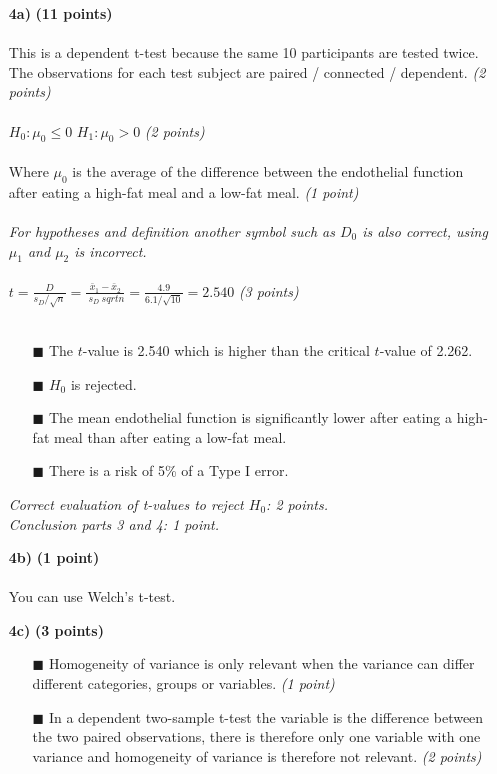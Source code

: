 \begin{itemize}
\item[\textbf{4a)}] \textbf{(11 points)} \\ \\
This is a dependent t-test because the same 10 participants are tested twice. The observations for each test subject are paired / connected / dependent. \textit{(2 points)}\\ \\
$H_0: \mu_0 \leq 0$ \hspace{3cm} $H_1: \mu_0 > 0$ \hspace{3cm} \textit{(2 points)} \\ \\
Where $\mu_0$ is the average of the difference between the endothelial function after eating a high-fat meal and a low-fat meal. \textit{(1 point)} \\ \\ 
\textit{For hypotheses and definition another symbol such as $D_0$ is also correct, using $\mu_1$ and $\mu_2$ is incorrect.} \\ \\
$t = \frac{D}{s_D / \sqrt{n}} = \frac{\bar{x}_1 - \bar{x}_2}{ \ s_D \ sqrt{n}} = \frac{4.9}{6.1 / \sqrt{10}} = 2.540$ \textit{(3 points)}\\ \\
        \begin{itemize}
        \item[$\blacksquare$] The $t$-value is 2.540 which is higher than the critical $t$-value of 2.262.
        \item[$\blacksquare$] $H_0$ is rejected.
        \item[$\blacksquare$] The mean endothelial function is significantly lower after eating a high-fat meal than after eating a low-fat meal.
\item[$\blacksquare$] There is a risk of 5\% of a Type I error.
        \end{itemize}
        \textit{Correct evaluation of t-values to reject $H_0$: 2 points. \\ Conclusion parts 3 and 4: 1 point.} \\
\item[\textbf{4b)}] \textbf{(1 point)} \\ \\
You can use Welch’s t-test. \\
\item[\textbf{4c)}] \textbf{(3 points)} \\
        \begin{itemize}
        \item[$\blacksquare$] Homogeneity of variance is only relevant when the variance can differ different categories, groups or variables. \textit{(1 point)}
        \item[$\blacksquare$] In a dependent two-sample t-test the variable is the difference between the two paired observations, there is therefore only one variable with one variance and homogeneity of variance is therefore not relevant. \textit{(2 points)}
        \end{itemize} \\
\end{itemize}

